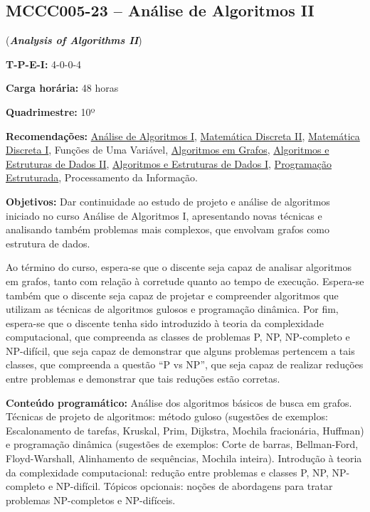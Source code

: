 \documentclass[class=article, crop=false]{standalone}
\begin{document}
\subsection*{MCCC005-23 -- Análise de Algoritmos II}
\label{disc:aaII}

(\textbf{\textit{Analysis of Algorithms II}})

\begin{center}
    \begin{minipage}{0.85\textwidth}
        \textbf{T-P-E-I:} 4-0-0-4
        
        \textbf{Carga horária:} 48 horas
        
        \textbf{Quadrimestre:} 10º
        
        \textbf{Recomendações:} 
        \hyperref[disc:aaI]{Análise de Algoritmos I},
        \hyperref[disc:mdII]{Matemática Discreta II},
        \hyperref[disc:mdI]{Matemática Discreta I},
        Funções de Uma Variável,
        \hyperref[disc:ag]{Algoritmos em Grafos},
        \hyperref[disc:aedII]{Algoritmos e Estruturas de Dados II},
        \hyperref[disc:aedI]{Algoritmos e Estruturas de Dados I},
        \hyperref[disc:pe]{Programação Estruturada},
        Processamento da Informação.
    
    \end{minipage}
\end{center}

\textbf{Objetivos:}
Dar continuidade ao estudo de projeto e análise de algoritmos iniciado no curso
Análise de Algoritmos I, apresentando novas técnicas e analisando também
problemas mais complexos, que envolvam grafos como estrutura de dados.

Ao término do curso, espera-se que o discente seja capaz de analisar algoritmos
em grafos, tanto com relação à corretude quanto ao tempo de execução.
Espera-se também que o discente seja capaz de projetar e compreender algoritmos
que utilizam as técnicas de algoritmos gulosos e programação dinâmica. 
Por fim, espera-se que o discente tenha sido introduzido à teoria da
complexidade computacional, que compreenda as classes de problemas P, NP,
NP-completo e NP-difícil, que seja capaz de demonstrar que alguns problemas
pertencem a tais classes, que compreenda a questão ``P vs NP'', que seja capaz
de realizar reduções entre problemas e demonstrar que tais reduções estão
corretas.

\textbf{Conteúdo programático:}
Análise dos algoritmos básicos de busca em grafos.
Técnicas de projeto de algoritmos: método guloso (sugestões de exemplos: Escalonamento
de tarefas, Kruskal, Prim, Dijkstra, Mochila fracionária, Huffman) e programação 
dinâmica (sugestões de exemplos: Corte de barras, Bellman-Ford, Floyd-Warshall, 
Alinhamento de sequências, Mochila inteira).
Introdução à teoria da complexidade computacional: redução entre problemas e 
classes P, NP, NP-completo e NP-difícil.
Tópicos opcionais: noções de abordagens para tratar problemas NP-completos e NP-difíceis.
\end{document}
